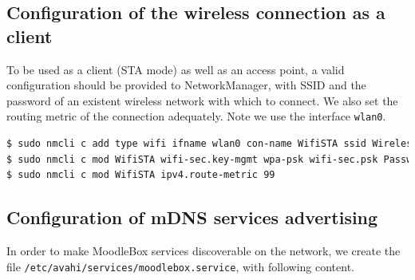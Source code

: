 \documentclass[12pt]{article}
\begin{document}
\subsection{Configuration of the wireless connection as a client}

To be used as a client (STA mode) as well as an access point, a valid configuration should be provided to NetworkManager, with SSID and the password of an existent wireless network with which to connect.
We also set the routing metric of the connection adequately.
Note we use the interface \lstinline{wlan0}.
\begin{lstlisting}[language=bash]
$ sudo nmcli c add type wifi ifname wlan0 con-name WifiSTA ssid WirelessLAN
$ sudo nmcli c mod WifiSTA wifi-sec.key-mgmt wpa-psk wifi-sec.psk Password
$ sudo nmcli c mod WifiSTA ipv4.route-metric 99
\end{lstlisting}

\subsection{Configuration of mDNS services advertising}

In order to make MoodleBox services discoverable on the network, we create the file \lstinline{/etc/avahi/services/moodlebox.service}, with following content.

\end{document}
